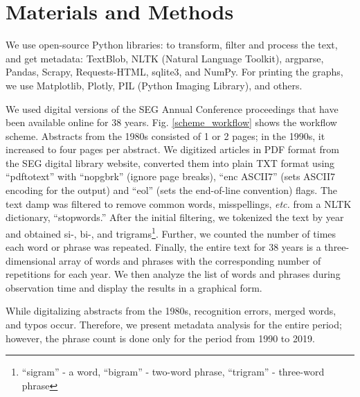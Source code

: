 \documentclass[geosciences,article,submit,moreauthors,pdftex]{Definitions/mdpi}
\begin{document}
\section{Materials and Methods}

We use open-source Python libraries: to transform, filter and process the text, and get metadata: TextBlob, NLTK (Natural Language Toolkit), argparse, Pandas, Scrapy, Requests-HTML, sqlite3, and NumPy. For printing the graphs, we use Matplotlib, Plotly, PIL (Python Imaging Library), and others.

We used digital versions of the SEG Annual Conference proceedings that have been available online for 38 years. Fig. \ref{scheme_workflow} shows the workflow scheme. Abstracts from the 1980s consisted of 1 or 2 pages; in the 1990s, it increased to four pages per abstract. We digitized articles in PDF format from the SEG digital library website, converted them into plain TXT format using ``pdftotext'' with ``nopgbrk'' (ignore page breaks), ``enc ASCII7'' (sets ASCII7 encoding for the output) and ``eol'' (sets the end-of-line convention) flags. The text damp was filtered to remove common words, misspellings, \textit{etc.} from a NLTK dictionary, ``stopwords.'' After the initial filtering, we tokenized the text by year and obtained si-, bi-, and trigrams\footnote{``sigram'' - a word, ``bigram'' - two-word phrase, ``trigram'' - three-word phrase}. Further, we counted the number of times each word or phrase was repeated. Finally, the entire text for 38 years is a three-dimensional array of words and phrases with the corresponding number of repetitions for each year. We then analyze the list of words and phrases during observation time and display the results in a graphical form.

While digitalizing abstracts from the 1980s, recognition errors, merged words, and typos occur. Therefore, we present metadata analysis for the entire period; however, the phrase count is done only for the period from 1990 to 2019.
\end{document}
